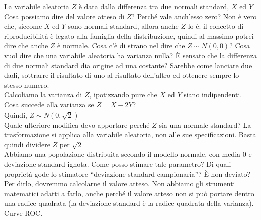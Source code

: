 \documentclass{article}
\begin{document}
    La variabile aleatoria $ Z $ è data dalla differenza tra due normali standard, $ X $ ed $ Y $ \\
    Cosa possiamo dire del valore atteso di $ Z $? Perché vale anch'esso zero? Non è vero che, siccome $ X $ ed $ Y $ sono normali standard, allora anche $ Z $ lo è: il concetto
    di riproducibilità è legato alla famiglia della distribuzione, quindi al massimo potrei dire che anche $ Z $ è normale. Cosa c'è di strano nel dire che $ Z \sim N(0, 0) $?
    Cosa vuol dire che una variabile aleatoria ha varianza nulla? È sensato che la differenza di due normali standard dia origine ad una costante? Sarebbe come lanciare due dadi,
    sottrarre il risultato di uno al risultato dell'altro ed ottenere sempre lo stesso numero. \\
    Calcoliamo la varianza di $ Z $, ipotizzando pure che $ X $ ed $ Y $ siano indipendenti. Cosa succede alla varianza se $ Z = X - 2Y $? \\
    Quindi, $ Z \sim N(0, \sqrt 2) $ \\
    Quale ulteriore modifica devo apportare perché $ Z $ sia una normale standard? La trasformazione si applica alla variabile aleatoria, non alle sue specificazioni. Basta 
    quindi dividere $ Z $ per $ \sqrt 2 $ \\
    Abbiamo una popolazione distribuita secondo il modello normale, con media $ 0 $ e deviazione standard ignota. Come posso stimare tale parametro? Di quali proprietà gode lo
    stimatore “deviazione standard campionaria”? È non deviato? Per dirlo, dovremmo calcolarne il valore atteso. Non abbiamo gli strumenti matematici adatti a farlo, anche perché
    il valore atteso non si può portare dentro una radice quadrata (la deviazione standard è la radice quadrata della varianza). \\
    Curve ROC.
    
\end{document}
